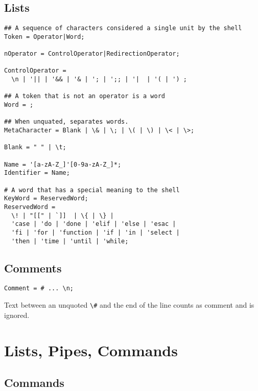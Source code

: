 \documentclass{article}
\begin{document}
\subsection{Lists}

\begin{verbatim}
## A sequence of characters considered a single unit by the shell        
Token = Operator|Word;
        
nOperator = ControlOperator|RedirectionOperator;
        
ControlOperator =
  \n | '|| | '&& | '& | '; | ';; | '|  | '( | ') ;
        
## A token that is not an operator is a word         
Word = ;        
        
## When unquated, separates words.
MetaCharacter = Blank | \& | \; | \( | \) | \< | \>;  	
        
Blank = " " | \t;
                
Name = '[a-zA-Z_]'[0-9a-zA-Z_]*;
Identifier = Name;                
        
# A word that has a special meaning to the shell        
KeyWord = ReservedWord;        
ReservedWord =
  \! | "[[" | `]]  | \{ | \} | 
  'case | 'do | 'done | 'elif | 'else | 'esac |
  'fi | 'for | 'function | 'if | 'in | 'select |
  'then | 'time | 'until | 'while;
\end{verbatim}


\subsection{Comments}

\begin{verbatim}
Comment = # ... \n;        
\end{verbatim}

Text between an unquoted \verb|\#| and the end of the line counts as comment and
is ignored.

\section{Lists, Pipes, Commands}

\subsection{Commands}
\end{document}
